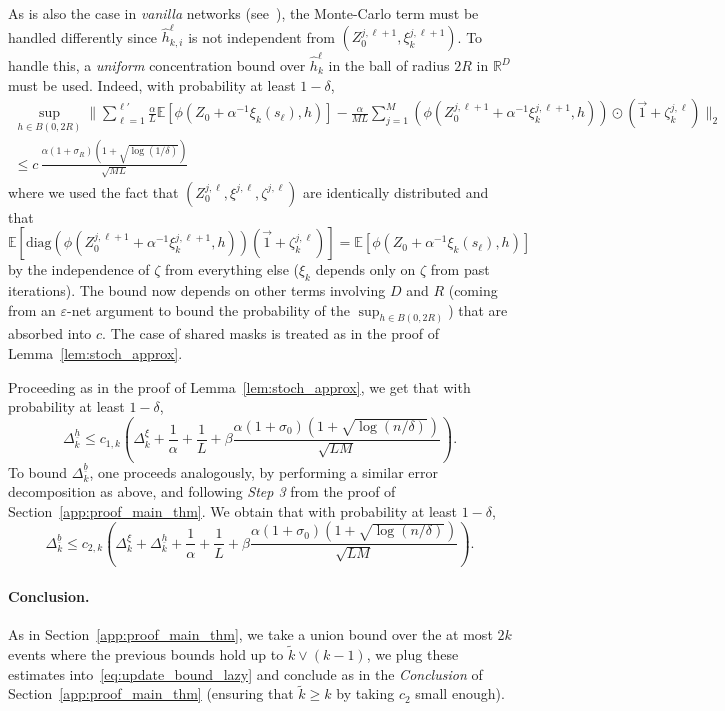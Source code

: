 \documentclass[a4paper,11pt]{article}
\newcommand{\R}{\mathbb{R}}
\newcommand{\1}{\mathbbm{1}}
\newcommand{\E}{\mathbb{E}}
\newcommand{\diag}{\mathrm{diag}}
\theoremstyle{definition}
\theoremstyle{remark}
\begin{document}
     As is also the case in \emph{vanilla} networks (see~\cite{chizat2025hidden}), the Monte-Carlo term must be handled differently since $\hat{h}_{k,i}^\ell$ is not independent from $(Z_0^{j,\ell+1}, \xi_k^{j,\ell+1})$. To handle this, a \emph{uniform} concentration bound over $\hat{h}_k^\ell$ in the ball of radius $2R$ in $\R^D$ must be used.
     Indeed, with probability at least $1-\delta$,
     \begin{multline*}
         \sup_{h\in B(0, 2R)}\Big\|\sum_{\ell=1}^{\ell'}\frac{\alpha}{L} \mathbb{E}[\phi(Z_0 + \alpha^{-1}\xi_k(s_\ell), h)] - \frac{\alpha}{ML} \sum_{j=1}^M (\phi(Z_0^{j,\ell+1} + \alpha^{-1}\xi_k^{j,\ell+1}, h)){\odot}(\vec{1}+\zeta_k^{j,\ell})\Big\|_2\\
         \leq c\, \frac{\alpha{(1+\sigma_R)}(1 + \sqrt{\log(1/\delta)})}{\sqrt{ML}}
     \end{multline*}
     where we used the fact that $(Z_0^{j,\ell}, \xi^{j,\ell}, \zeta^{j,\ell})$ are identically distributed and that $\E[\diag(\phi(Z_0^{j,\ell+1} + \alpha^{-1}\xi_k^{j,\ell+1}, h))(\vec{1}+\zeta_k^{j,\ell})] = \mathbb{E}[\phi(Z_0 + \alpha^{-1}\xi_k(s_\ell), h)]$ by the independence of $\zeta$ from everything else ($\xi_k$ depends only on $\zeta$ from past iterations). The bound now depends on other terms involving $D$ and $R$ (coming from an $\varepsilon$-net argument to bound the probability of the $\sup_{h\in B(0,2R)}$) that are absorbed into $c$. {The case of shared masks is treated as in the proof of Lemma~\ref{lem:stoch_approx}.}

    Proceeding as in the proof of Lemma~\ref{lem:stoch_approx}, we get that with probability at least $1-\delta$,
    \[
        \Delta_k^{\underline{h}} \le c_{1,k} \left( \Delta_k^\xi + \frac{1}{\alpha} + \frac{1}{L} + {\beta}\frac{\alpha{(1+\sigma_0)}(1+\sqrt{\log(n/\delta)})}{\sqrt{LM}} \right).
    \]
    To bound $\Delta_k^{\underline{b}}$, one proceeds analogously, by performing a similar error decomposition as above, and following \emph{Step 3} from the proof of Section~\ref{app:proof_main_thm}. We obtain that with probability at least $1-\delta$,
    \[
        \Delta_k^{\underline{b}} \le c_{2,k} \left( \Delta_k^\xi + \Delta_k^{\underline{h}} + \frac{1}{\alpha} + \frac{1}{L} + {\beta}\frac{\alpha{(1+\sigma_0)}(1+\sqrt{\log(n/\delta)})}{\sqrt{LM}} \right).
    \]

    \paragraph{Conclusion.} As in Section~\ref{app:proof_main_thm}, we take a union bound over the at most $2k$ events where the previous bounds hold up to $\tilde{k} \vee (k-1)$, we plug these estimates into~\eqref{eq:update_bound_lazy} and conclude as in the \emph{Conclusion} of Section~\ref{app:proof_main_thm} (ensuring that $\tilde{k} \ge k$ by taking $c_2$ small enough).
\end{document}
